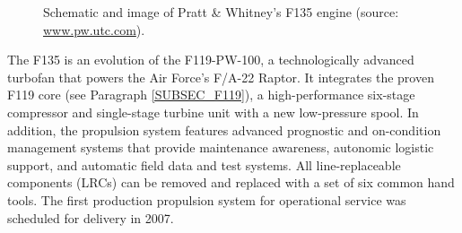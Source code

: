 \begin{figure}[!htb!]
 \centering
    \caption{\label{FIG_PW135_SCHEMATIC_FIG}Schematic and image of Pratt \& Whitney's F135 engine (source: \url{www.pw.utc.com}).}
\end{figure}
The F135 is an evolution of the F119-PW-100, a technologically advanced turbofan that powers the Air Force's F/A-22 Raptor. It integrates the proven F119 core (see Paragraph \ref{SUBSEC_F119}), a high-performance six-stage compressor and single-stage turbine unit with a new low-pressure spool. In addition, the propulsion system features advanced prognostic and on-condition management systems that provide maintenance awareness, autonomic logistic support, and automatic field data and test systems. All line-replaceable components (LRCs) can be removed and replaced with a set of six common hand tools. The first production propulsion system for operational service was scheduled for delivery in 2007.

